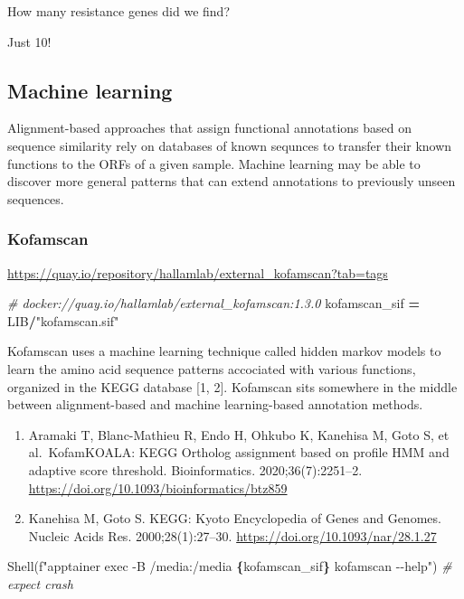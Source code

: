 \documentclass[
]{book}
\newenvironment{Shaded}{\begin{snugshade}}{\end{snugshade}}
\newcommand{\CommentTok}[1]{\textcolor[rgb]{0.56,0.35,0.01}{\textit{#1}}}
\newcommand{\NormalTok}[1]{#1}
\newcommand{\OperatorTok}[1]{\textcolor[rgb]{0.81,0.36,0.00}{\textbf{#1}}}
\newcommand{\SpecialCharTok}[1]{\textcolor[rgb]{0.81,0.36,0.00}{\textbf{#1}}}
\newcommand{\SpecialStringTok}[1]{\textcolor[rgb]{0.31,0.60,0.02}{#1}}
\newcommand{\StringTok}[1]{\textcolor[rgb]{0.31,0.60,0.02}{#1}}
\providecommand{\tightlist}{%
  \setlength{\itemsep}{0pt}\setlength{\parskip}{0pt}}
\begin{document}
How many resistance genes did we find?

Just 10!

\subsection{Machine learning}\label{machine-learning}

Alignment-based approaches that assign functional annotations based on sequence similarity rely on databases of known sequnces
to transfer their known functions to the ORFs of a given sample. Machine learning may be able to discover more general patterns
that can extend annotations to previously unseen sequences.

\subsubsection{Kofamscan}\label{kofamscan}

\url{https://quay.io/repository/hallamlab/external_kofamscan?tab=tags}

\begin{Shaded}
\begin{Highlighting}[numbers=left,,]
\CommentTok{\# docker://quay.io/hallamlab/external\_kofamscan:1.3.0}
\NormalTok{kofamscan\_sif }\OperatorTok{=}\NormalTok{ LIB}\OperatorTok{/}\StringTok{"kofamscan.sif"}
\end{Highlighting}
\end{Shaded}

Kofamscan uses a machine learning technique called hidden markov models to learn the amino acid sequence patterns
accociated with various functions, organized in the KEGG database {[}1, 2{]}. Kofamscan sits somewhere in the middle
between alignment-based and machine learning-based annotation methods.

\begin{enumerate}
\def\labelenumi{\arabic{enumi}.}
\tightlist
\item
  Aramaki T, Blanc-Mathieu R, Endo H, Ohkubo K, Kanehisa M, Goto S, et al.~KofamKOALA: KEGG Ortholog assignment based on profile HMM and adaptive score threshold. Bioinformatics. 2020;36(7):2251--2. \url{https://doi.org/10.1093/bioinformatics/btz859}
\item
  Kanehisa M, Goto S. KEGG: Kyoto Encyclopedia of Genes and Genomes. Nucleic Acids Res. 2000;28(1):27--30. \url{https://doi.org/10.1093/nar/28.1.27}
\end{enumerate}

\begin{Shaded}
\begin{Highlighting}[numbers=left,,]
\NormalTok{Shell(}\SpecialStringTok{f"apptainer exec {-}B /media:/media }\SpecialCharTok{\{}\NormalTok{kofamscan\_sif}\SpecialCharTok{\}}\SpecialStringTok{ kofamscan {-}{-}help"}\NormalTok{) }\CommentTok{\# expect crash}
\end{Highlighting}
\end{Shaded}
\end{document}
